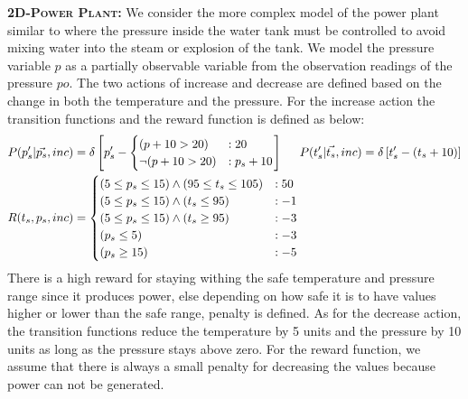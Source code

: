 \documentclass{article} %
\begin{document}
{\bf \textsc{2D-Power Plant}:} We consider the more complex model of the power plant similar to \cite{steam2} where the pressure inside the water tank must be controlled to avoid mixing water into the steam or explosion of the tank. We model the pressure variable $p$ as a partially observable variable from the observation readings of the pressure $po$. The two actions of increase and decrease are defined based on the change in both the temperature and the pressure. For the increase action the transition functions and the reward function is defined as below: 
{\footnotesize
\begin{align}
P(p_s'|\vec{p_s},inc)&= \delta\left[ p_s' - 
\begin{cases}
 (p+10> 20) &: 20 \\ 
\neg (p+10> 20) &: p_s + 10 \\
\end{cases}
\right]\nonumber
\hspace{5mm} 
P(t_s'|\vec{t_s},inc)= \delta\left[ t_s' - (t_s +10) \right]\nonumber
\\
R(t_s,p_s,inc) &= 
\begin{cases}
(5 \leq p_s \leq 15)\wedge (95 \leq t_s \leq 105)&:50\\
(5 \leq p_s \leq 15)\wedge (t_s \leq 95)&: -1\\
(5 \leq p_s \leq 15)\wedge (t_s \geq 95)&: -3\\				
(p_s \leq 5) &: -3\\						
(p_s \geq 15) &: -5\\ 
\end{cases}\nonumber
\end{align}
}
There is a high reward for staying withing the safe temperature and pressure range since it produces power, else depending on how safe it is to have values higher or lower than the safe range, penalty is defined.
As for the decrease action, the transition functions reduce the temperature by 5 units and the pressure by 10 units as long as the pressure stays above zero. For the reward function, we assume that there is always a small penalty for decreasing the values because power can not be generated. 
\end{document}
